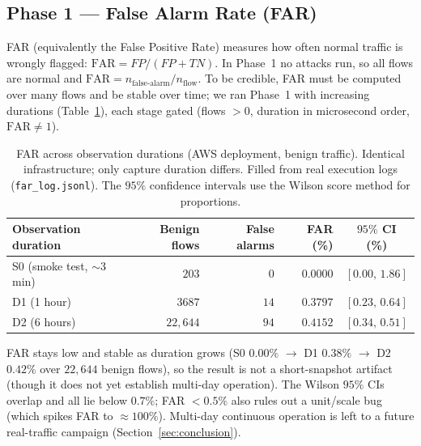 \documentclass[preprint,12pt,authoryear]{elsarticle}
\begin{document}
\subsection{Phase 1 --- False Alarm Rate (FAR)}
\label{sec:rt-far}
FAR (equivalently the False Positive Rate) measures how often normal traffic is
wrongly flagged: $\mathrm{FAR} = FP/(FP+TN)$. In Phase~1 no attacks run, so all
flows are normal and $\mathrm{FAR} = n_{\text{false-alarm}}/n_{\text{flow}}$. To be
credible, FAR must be computed over many flows and be stable over time; we ran
Phase~1 with increasing durations (Table~\ref{tab:far}), each stage gated
(flows $>0$, duration in microsecond order, $\mathrm{FAR}\neq 1$).

\begin{table}[h]
\centering
\caption{FAR across observation durations (AWS deployment, benign traffic).
Identical infrastructure; only capture duration differs. Filled from real
execution logs (\texttt{far\_log.jsonl}). The $95\%$ confidence intervals use the
Wilson score method for proportions.}
\label{tab:far}
\begin{tabular}{lrrrc}
\toprule
Observation duration & Benign flows & False alarms & FAR (\%) & $95\%$ CI (\%) \\
\midrule
S0 (smoke test, $\sim$3 min) & $203$    & $0$  & $0.0000$ & $[0.00,\,1.86]$ \\
D1 (1 hour)                  & $3687$   & $14$ & $0.3797$ & $[0.23,\,0.64]$ \\
D2 (6 hours)                 & $22{,}644$ & $94$ & $0.4152$ & $[0.34,\,0.51]$ \\
\bottomrule
\end{tabular}
\end{table}

\noindent FAR stays low and stable as duration grows (S0 $0.00\%$ $\rightarrow$ D1
$0.38\%$ $\rightarrow$ D2 $0.42\%$ over $22{,}644$ benign flows), so the result is
not a short-snapshot artifact (though it does not yet establish multi-day
operation). The Wilson $95\%$ CIs overlap and all lie below $0.7\%$; FAR $<0.5\%$
also rules out a unit/scale bug (which spikes FAR to $\approx 100\%$). Multi-day
continuous operation is left to a future real-traffic campaign
(Section~\ref{sec:conclusion}).
\end{document}
